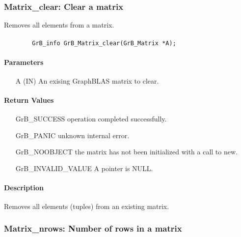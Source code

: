 \subsubsection{{\sf Matrix\_clear}: Clear a matrix}

Removes all elements from a matrix.

\paragraph{\syntax}

\begin{verbatim}
        GrB_info GrB_Matrix_clear(GrB_Matrix *A);
\end{verbatim}

\paragraph{Parameters}

\begin{itemize}[leftmargin=1.1in]
    \item[{\sf A}] ({\sf IN}) An exising GraphBLAS matrix to clear.
\end{itemize}

\paragraph{Return Values}

\begin{itemize}[leftmargin=2.1in]
\item[{\sf GrB\_SUCCESS}]   operation completed successfully.
\item[{\sf GrB\_PANIC}]     unknown internal error.
\item[{\sf GrB\_NOOBJECT}]  the matrix has not been initialized with a call to new.
\item[{\sf GrB\_INVALID\_VALUE}]    {\sf A} pointer is {\sf NULL}.
\end{itemize}

\paragraph{Description}

Removes all elements (tuples) from an existing matrix.

\subsubsection{{\sf Matrix\_nrows}: Number of rows in a matrix}

